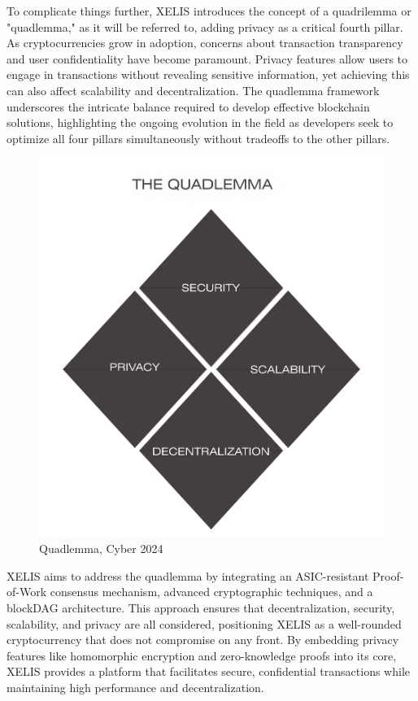 \documentclass[12pt,a4paper,twocolumn]{article}
\begin{document}
To complicate things further, XELIS introduces the concept of a quadrilemma or "quadlemma," as it will be referred to, adding privacy as a critical fourth pillar. As cryptocurrencies grow in adoption, concerns about transaction transparency and user confidentiality have become paramount. Privacy features allow users to engage in transactions without revealing sensitive information, yet achieving this can also affect scalability and decentralization. The quadlemma framework underscores the intricate balance required to develop effective blockchain solutions, highlighting the ongoing evolution in the field as developers seek to optimize all four pillars simultaneously without tradeoffs to the other pillars. \\




\begin{figure}
    \centering
    \includegraphics[width=1\linewidth]{Frame 9.png}
    \caption{Quadlemma, Cyber 2024}
\end{figure}

XELIS aims to address the quadlemma by integrating an ASIC-resistant Proof-of-Work consensus mechanism, advanced cryptographic techniques, and a blockDAG architecture. This approach ensures that decentralization, security, scalability, and privacy are all considered, positioning XELIS as a well-rounded cryptocurrency that does not compromise on any front. By embedding privacy features like homomorphic encryption and zero-knowledge proofs into its core, XELIS provides a platform that facilitates secure, confidential transactions while maintaining high performance and decentralization.\\
\end{document}
